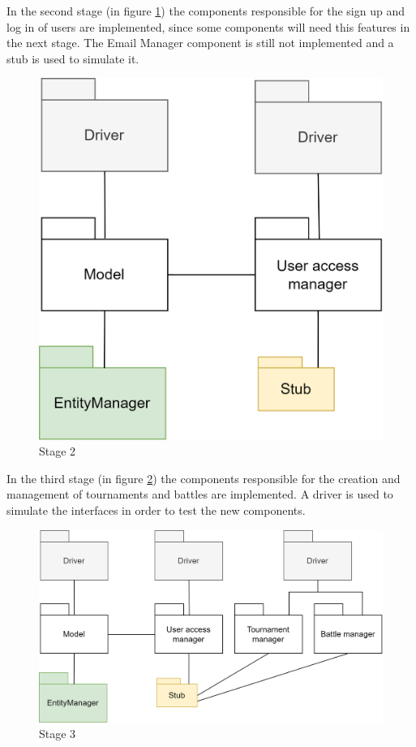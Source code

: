 In the second stage (in figure \ref{fig:stage2}) the components responsible for the sign up and log in of users are implemented, since some components will need this features in the next stage. The Email Manager component is still not implemented and a stub is used to simulate it. 
\begin{figure}[h]
    \centering
    \includegraphics[scale=0.7]{images/testing/stage2.png}
    \caption{Stage 2}
    \label{fig:stage2}
\end{figure}

In the third stage (in figure \ref{fig:stage3}) the components responsible for the creation and management of tournaments and battles are implemented. A driver is used to simulate the interfaces in order to test the new components.  
\begin{figure}[h]
    \centering
    \includegraphics[scale=0.7]{images/testing/stage3.png}
    \caption{Stage 3}
    \label{fig:stage3}
\end{figure}
\clearpage

